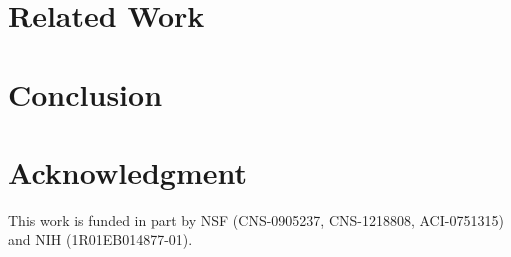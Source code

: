 \documentclass[conference,compsoc]{IEEEtran}
\begin{document}
\section{Related Work}
\vspace{-0.1in}
\label{sec:related_work}


\vspace{-0.1in}
\section{Conclusion}
\vspace{-0.1in}


\vspace{-0.1in}
\section*{Acknowledgment}
\vspace{-0.1in}
This work is funded in part by NSF (CNS-0905237, CNS-1218808, ACI-0751315) and NIH
(1R01EB014877-01).

\vspace{-0.1in}

%

\end{document}
